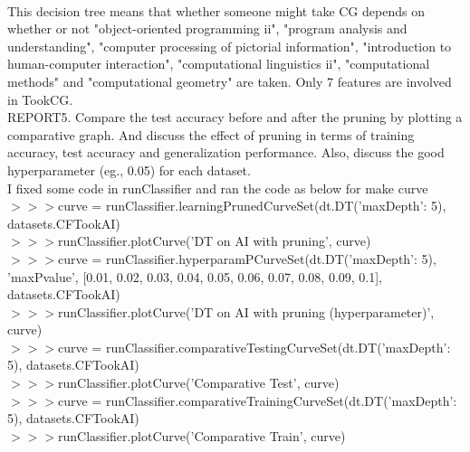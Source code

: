 \documentclass[a4 paper]{article}
\numberwithin{equation}{section}
\newcommand{\0}{\mathbf{0}}
\begin{document}
 \\
This decision tree means that whether someone might take CG depends on whether or not "object-oriented programming ii", "program analysis and understanding", "computer processing of pictorial information", "introduction to human-computer interaction", "computational linguistics ii", "computational methods" and "computational geometry" are taken. Only 7 features are involved in TookCG.
\\

REPORT5. Compare the test accuracy before and after the pruning by plotting a comparative graph. And discuss the effect of pruning in terms of training accuracy, test accuracy and generalization performance. Also, discuss the good hyperparameter (eg., 0.05) for each dataset. \\
I fixed some code in runClassifier and ran the code as below for make curve \\
$>>>$curve = runClassifier.learningPrunedCurveSet(dt.DT({'maxDepth': 5}), datasets.CFTookAI) \\
$>>>$runClassifier.plotCurve('DT on AI with pruning', curve) \\
$>>>$curve = runClassifier.hyperparamPCurveSet(dt.DT({'maxDepth': 5}), 'maxPvalue', [0.01, 0.02, 0.03, 0.04, 0.05, 0.06, 0.07, 0.08, 0.09, 0.1], datasets.CFTookAI) \\
$>>>$runClassifier.plotCurve('DT on AI with pruning (hyperparameter)', curve) \\
$>>>$curve = runClassifier.comparativeTestingCurveSet(dt.DT({'maxDepth': 5}), datasets.CFTookAI) \\
$>>>$runClassifier.plotCurve('Comparative Test', curve) \\
$>>>$curve = runClassifier.comparativeTrainingCurveSet(dt.DT({'maxDepth': 5}), datasets.CFTookAI) \\
$>>>$runClassifier.plotCurve('Comparative Train', curve) \\
\end{document}
